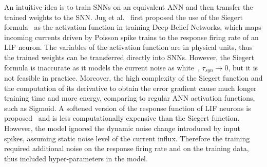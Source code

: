 \documentclass{article}
\begin{document}
	An intuitive idea is to train SNNs on an equivalent ANN and then transfer the trained weights to the SNN.
	Jug et al.~\cite{Jug_etal_2012} first proposed the use of the Siegert formula~\cite{siegert1951first} as the activation function in training Deep Belief Networks, which maps incoming currents driven by Poisson spike trains to the response firing rate of an LIF neuron.
	The variables of the activation function are in physical units, thus the trained weights can be transferred directly into SNNs.
	However, the Siegert formula is inaccurate as it models the current noise as white~\cite{liu2016noisy}, $\tau_{syn} \to 0$, but it is not feasible in practice.
	Moreover, the high complexity of the Siegert function and the computation of its derivative to obtain the error gradient cause much longer training time and more energy, comparing to regular ANN activation functions, such as Sigmoid.
	A softened version of the response function of LIF neurons is proposed~\cite{hunsberger2015spiking} and is less computationally expensive than the Siegert function.
	However, the model ignored the dynamic noise change introduced by input spikes, assuming static noise level of the current influx.
	Therefore the training required additional noise on the response firing rate and on the training data, thus included hyper-parameters in the model.
	
\end{document}
